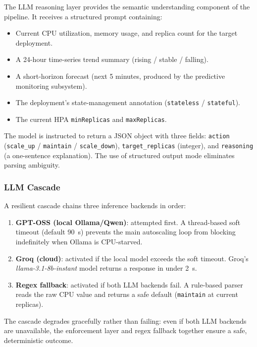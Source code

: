 The LLM reasoning layer provides the semantic understanding component of the
pipeline. It receives a structured prompt containing:

\begin{itemize}
  \item Current CPU utilization, memory usage, and replica count for the target
  deployment.
  \item A 24-hour time-series trend summary (rising / stable / falling).
  \item A short-horizon forecast (next 5 minutes, produced by the predictive
  monitoring subsystem).
  \item The deployment's state-management annotation (\texttt{stateless} /
  \texttt{stateful}).
  \item The current HPA \texttt{minReplicas} and \texttt{maxReplicas}.
\end{itemize}

The model is instructed to return a JSON object with three fields:
\texttt{action} (\texttt{scale\_up} / \texttt{maintain} / \texttt{scale\_down}),
\texttt{target\_replicas} (integer), and \texttt{reasoning} (a one-sentence
explanation). The use of structured output mode eliminates parsing ambiguity.

\subsubsection{LLM Cascade}
\label{sec:cascade}

A resilient cascade chains three inference backends in order:

\begin{enumerate}
  \item \textbf{GPT-OSS (local Ollama/Qwen)}: attempted first. A thread-based
  soft timeout (default 90~s) prevents the main autoscaling loop from blocking
  indefinitely when Ollama is CPU-starved.

  \item \textbf{Groq (cloud)}: activated if the local model exceeds the soft
  timeout. Groq's \textit{llama-3.1-8b-instant} model returns a response in
  under 2~s.

  \item \textbf{Regex fallback}: activated if both LLM backends fail. A
  rule-based parser reads the raw CPU value and returns a safe default
  (\texttt{maintain} at current replicas).
\end{enumerate}

The cascade degrades gracefully rather than failing: even if both LLM backends
are unavailable, the enforcement layer and regex fallback together ensure a
safe, deterministic outcome.

